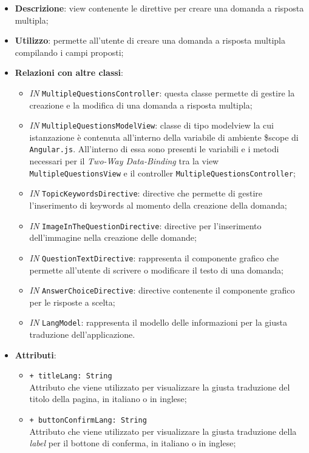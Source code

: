 \begin{itemize}
	\item \textbf{Descrizione}: view contenente le direttive per creare una domanda a risposta multipla;
	\item \textbf{Utilizzo}: permette all'utente di creare una domanda a risposta multipla compilando i campi proposti;
	\item \textbf{Relazioni con altre classi}:
		\begin{itemize}
			\item \textit{IN} \texttt{MultipleQuestionsController}: questa classe permette di gestire la creazione e la modifica di una domanda a risposta multipla;
			\item \textit{IN} \texttt{MultipleQuestionsModelView}: classe di tipo modelview la cui istanzazione è contenuta all'interno della variabile di ambiente \$scope di \texttt{Angular.js}. All'interno di essa sono presenti le variabili e i metodi necessari per il \textit{Two-Way Data-Binding} tra la view \texttt{MultipleQuestionsView} e il controller \texttt{MultipleQuestionsController};
			\item \textit{IN} \texttt{TopicKeywordsDirective}: directive che permette di gestire l'inserimento di keywords al momento della creazione della domanda;
			\item \textit{IN} \texttt{ImageInTheQuestionDirective}: directive per l'inserimento dell'immagine nella creazione delle domande;
			\item \textit{IN} \texttt{QuestionTextDirective}: rappresenta il componente grafico che permette all'utente di scrivere o modificare il testo di una domanda;
			\item \textit{IN} \texttt{AnswerChoiceDirective}: directive contenente il componente grafico per le risposte a scelta;
			\item \textit{IN} \texttt{LangModel}: rappresenta il modello delle informazioni per la giusta traduzione dell'applicazione.
		\end{itemize}
	\item \textbf{Attributi}:
	\begin{itemize}
		\item \texttt{+ titleLang: String} \\ Attributo che viene utilizzato per visualizzare la giusta traduzione del titolo della pagina, in italiano o in inglese;
		\item \texttt{+ buttonConfirmLang: String} \\ Attributo che viene utilizzato per visualizzare la giusta traduzione della \textit{label} per il bottone di conferma, in italiano o in inglese;

\end{itemize}
\end{itemize}
